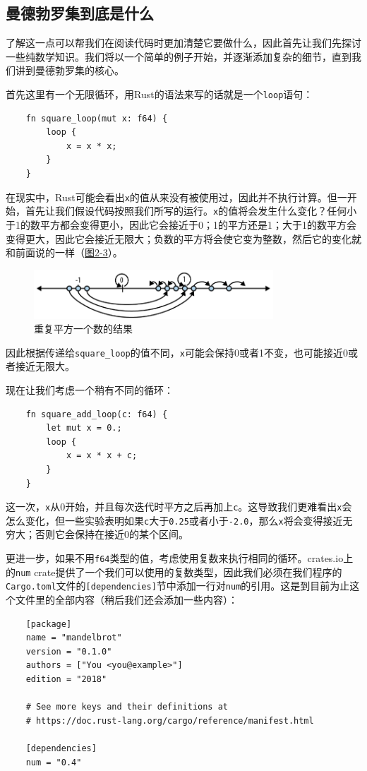 \subsection{曼德勃罗集到底是什么}
了解这一点可以帮我们在阅读代码时更加清楚它要做什么，因此首先让我们先探讨一些纯数学知识。我们将以一个简单的例子开始，并逐渐添加复杂的细节，直到我们讲到曼德勃罗集的核心。

首先这里有一个无限循环，用Rust的语法来写的话就是一个\texttt{loop}语句：
\begin{verbatim}
    fn square_loop(mut x: f64) {
        loop {
            x = x * x;
        }
    }
\end{verbatim}

在现实中，Rust可能会看出\texttt{x}的值从来没有被使用过，因此并不执行计算。但一开始，首先让我们假设代码按照我们所写的运行。\texttt{x}的值将会发生什么变化？任何小于1的数平方都会变得更小，因此它会接近于0；1的平方还是1；大于1的数平方会变得更大，因此它会接近无限大；负数的平方将会使它变为整数，然后它的变化就和前面说的一样（\hyperref[f2-3]{图2-3}）。
\begin{figure}[htbp]
    \centering
    \includegraphics[width=0.8\textwidth]{../img/f2-3.png}
    \caption{重复平方一个数的结果}
    \label{f2-3}
\end{figure}

因此根据传递给\texttt{square\_loop}的值不同，\texttt{x}可能会保持0或者1不变，也可能接近0或者接近无限大。

现在让我们考虑一个稍有不同的循环：
\begin{verbatim}
    fn square_add_loop(c: f64) {
        let mut x = 0.;
        loop {
            x = x * x + c;
        }
    }
\end{verbatim}

这一次，\texttt{x}从0开始，并且每次迭代时平方之后再加上\texttt{c}。这导致我们更难看出\texttt{x}会怎么变化，但一些实验表明如果\texttt{c}大于\texttt{0.25}或者小于\texttt{-2.0}，那么\texttt{x}将会变得接近无穷大；否则它会保持在接近0的某个区间。

更进一步，如果不用\texttt{f64}类型的值，考虑使用复数来执行相同的循环。crates.io上的\texttt{num} crate提供了一个我们可以使用的复数类型，因此我们必须在我们程序的\texttt{Cargo.toml}文件的\texttt{[dependencies]}节中添加一行对\texttt{num}的引用。这是到目前为止这个文件里的全部内容（稍后我们还会添加一些内容）：
\begin{verbatim}
    [package]
    name = "mandelbrot"
    version = "0.1.0"
    authors = ["You <you@example>"]
    edition = "2018"

    # See more keys and their definitions at
    # https://doc.rust-lang.org/cargo/reference/manifest.html

    [dependencies]
    num = "0.4"
\end{verbatim}

